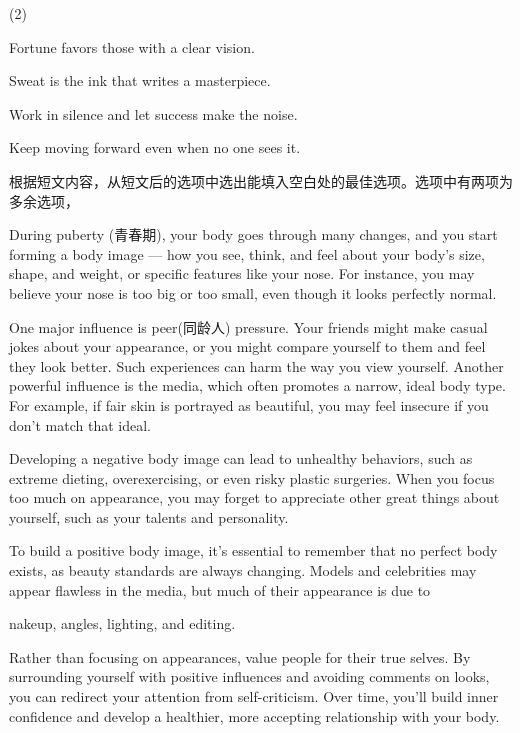 \documentclass{英语试卷}
\begin{document}
\begin{choices}(2)
  \item Fortune favors those with a clear vision.
  \item Sweat is the ink that writes a masterpiece.
  \item Work in silence and let success make the noise.
  \item Keep moving forward even when no one sees it.
\end{choices}
\par 根据短文内容，从短文后的选项中选出能填入空白处的最佳选项。选项中有两项为多余选项，\par
\par During puberty (青春期), your body goes through many changes, and you start forming a body image — how you see, think, and feel about your body's size, shape, and weight, or specific features like your nose.  For instance, you may believe your nose is too big or too small, even though it looks perfectly normal.\par
\par {} One major influence is peer(同龄人) pressure. Your friends might make casual jokes about your appearance, or you might compare yourself to them and feel they look better. Such experiences can harm the way you view yourself. Another powerful influence is the media, which often promotes a narrow, ideal body type. For example, if fair skin is portrayed as beautiful, you may feel insecure if you don't match that ideal.\par
\par Developing a negative body image can lead to unhealthy behaviors, such as extreme dieting, overexercising, or even risky plastic surgeries.  When you focus too much on appearance, you may forget to appreciate other great things about yourself, such as your talents and personality.\par
\par To build a positive body image, it's essential to remember that no perfect body exists, as beauty standards are always changing. Models and celebrities may appear flawless in the media, but much of their appearance is due to\par
\par nakeup, angles, lighting, and editing. \par
\par Rather than focusing on appearances, value people for their true selves. By surrounding yourself with positive influences and avoiding comments on looks, you can redirect your attention from self-criticism.  Over time, you'll build inner confidence and develop a healthier, more accepting relationship with your body.\par
\end{document}
